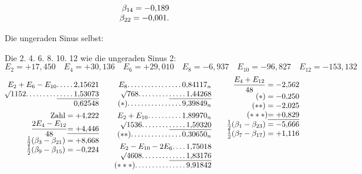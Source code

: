 \begin{landscape}
\[\begin{array}{@{}r@{\qquad}r@{\qquad}r@{}}
\begin{array}[t]{@{}r@{}}
\beta_{14}=-0{,}189\\
\beta_{22}=-0{,}001.
\end{array}
\end{array}
\]
\par\noindent\hspace*{\parindent}Die ungeraden Sinus selbst:
\par\noindent\hspace*{\parindent}Die 2. 4. 6. 8. 10. 12 wie die ungeraden Sinus 2:
\[E_2=+17{,}450\quad E_4=+30{,}136\quad E_6=+29{,}010\quad E_8=-6{,}937\quad E_{10}=-96{,}827\quad E_{12}=-153{,}132\]
\[
\begin{array}{@{}r@{\qquad}r@{\qquad}r@{}}
\begin{array}[t]{@{}r@{}}
E_2+E_6-E_{10}\VfourDots{4}2{,}15621\\
\BareRoot{1152}\VfourDots{8}\underline{\VfourDots{4}1{,}53073}\\
0{,}62548\\[4pt]
\text{Zahl}=+4{,}222\\
\dfrac{2E_4-E_{12}}{48}\underline{=+4{,}446}\\
\tfrac12(\beta_3-\beta_{21})=+8{,}668\\
\tfrac12(\beta_9-\beta_{15})=-0{,}224
\end{array}
&\begin{array}[t]{@{}r@{}}
E_8\VfourDots{15}0{,}84117_n\\
\BareRoot{768}\VfourDots{8}\underline{\VfourDots{4}1{,}44268}\\
(*)\VfourDots{15}9{,}39849_n\\[4pt]
E_2+E_{10}\VfourDots{9}1{,}89970_n\\
\BareRoot{1536}\VfourDots{7}\underline{\VfourDots{4}1{,}59320}\\
(**)\VfourDots{14}0{,}30650_n\\[4pt]
E_2-E_{10}-2E_6\VfourDots{3}1{,}75018\\
\BareRoot{4608}\VfourDots{7}\underline{\VfourDots{4}1{,}83176}\\
(***)\VfourDots{14}9{,}91842
\end{array}
&\begin{array}[t]{@{}r@{}}
\dfrac{E_4+E_{12}}{48}=-2{,}562\\
(*)=-0{,}250\\
(**)=-2{,}025\\
(***)\underline{=+0{,}829}\\
\tfrac12(\beta_1-\beta_{23})=-5{,}666\\
\tfrac12(\beta_7-\beta_{17})=+1{,}116\\

\end{array}
\end{array}\]
\end{landscape}
